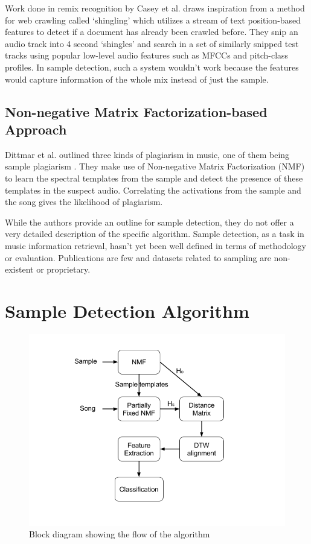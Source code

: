 \documentclass{article}
\begin{document}
Work done in remix recognition by Casey et al. \cite{caseyRemix} draws inspiration from a method for web crawling called `shingling' which utilizes a stream of text position-based features to detect if a document has already been crawled before. They snip an audio track into 4 second `shingles' and search in a set of similarly snipped test tracks using popular low-level audio features such as MFCCs and pitch-class profiles. In sample detection, such a system wouldn't work because the features would capture information of the whole mix instead of just the sample.

\subsection{Non-negative Matrix Factorization-based Approach}

Dittmar et al. outlined three kinds of plagiarism in music, one of them being sample plagiarism \cite{dittmar2012audio}. They make use of Non-negative Matrix Factorization (NMF) to learn the spectral templates from the sample and detect the presence of these templates in the suspect audio. Correlating the activations from the sample and the song gives the likelihood of plagiarism.

While the authors provide an outline for sample detection, they do not offer a very detailed description of the specific algorithm. Sample detection, as a task in music information retrieval, hasn't yet been well defined in terms of methodology or evaluation. Publications are few and datasets related to sampling are non-existent or proprietary.


\section{Sample Detection Algorithm}
\label{algo}

\begin{figure}[!ht]
\centering
\includegraphics[width=\linewidth]{block_diagram.png}
\caption{Block diagram showing the flow of the algorithm}
\label{fig_block}
\end{figure}
\end{document}
